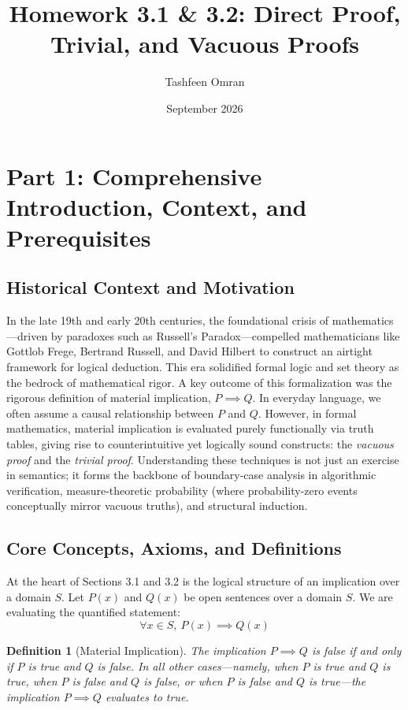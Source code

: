 \documentclass[11pt]{article}
\title{\textbf{Homework 3.1 \& 3.2: Direct Proof, Trivial, and Vacuous Proofs}}
\author{Tashfeen Omran}
\date{September 2026}
\newtheorem{definition}{Definition}[section]
\theoremstyle{remark}
\begin{document}
\maketitle
\tableofcontents
\newpage

\section{Part 1: Comprehensive Introduction, Context, and Prerequisites}

\subsection{Historical Context and Motivation}
In the late 19th and early 20th centuries, the foundational crisis of mathematics—driven by paradoxes such as Russell's Paradox—compelled mathematicians like Gottlob Frege, Bertrand Russell, and David Hilbert to construct an airtight framework for logical deduction. This era solidified formal logic and set theory as the bedrock of mathematical rigor. A key outcome of this formalization was the rigorous definition of material implication, $P \implies Q$. In everyday language, we often assume a causal relationship between $P$ and $Q$. However, in formal mathematics, material implication is evaluated purely functionally via truth tables, giving rise to counterintuitive yet logically sound constructs: the \textit{vacuous proof} and the \textit{trivial proof}. Understanding these techniques is not just an exercise in semantics; it forms the backbone of boundary-case analysis in algorithmic verification, measure-theoretic probability (where probability-zero events conceptually mirror vacuous truths), and structural induction.

\subsection{Core Concepts, Axioms, and Definitions}
At the heart of Sections 3.1 and 3.2 is the logical structure of an implication over a domain $S$. 
Let $P(x)$ and $Q(x)$ be open sentences over a domain $S$. We are evaluating the quantified statement:
\[ \forall x \in S, \ P(x) \implies Q(x) \]

\begin{definition}[Material Implication]
The implication $P \implies Q$ is false if and only if $P$ is true and $Q$ is false. In all other cases—namely, when $P$ is true and $Q$ is true, when $P$ is false and $Q$ is false, or when $P$ is false and $Q$ is true—the implication $P \implies Q$ evaluates to true.
\end{definition}
\end{document}
